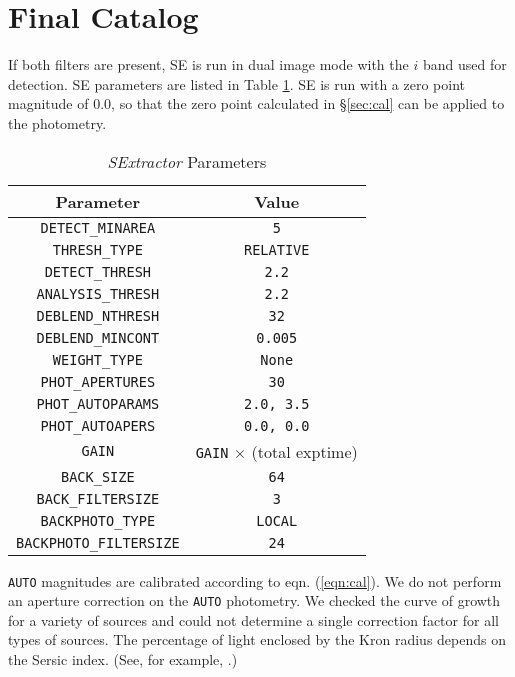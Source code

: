 \documentclass{article}
\begin{document}
\section{Final Catalog}
If both filters are present, SE is run in dual image
mode with the $i$ band used for detection.  SE parameters are listed
in Table \ref{tab:SE}. SE is run with a zero point magnitude of $0.0$,
so that the zero point calculated in \S \ref{sec:cal} can be applied
to the photometry. \\
\begin{table}
\begin{center}
\caption{\textit{SExtractor} Parameters}
\label{tab:SE}
\begin{tabular}{cc}
\hline
Parameter & Value \\
\hline
\texttt{DETECT\_MINAREA} & \texttt{5} \\
\texttt{THRESH\_TYPE} & \texttt{RELATIVE} \\
\texttt{DETECT\_THRESH} & \texttt{2.2} \\
\texttt{ANALYSIS\_THRESH} & \texttt{2.2} \\
\texttt{DEBLEND\_NTHRESH} & \texttt{32} \\
\texttt{DEBLEND\_MINCONT} & \texttt{0.005} \\
\hline
\texttt{WEIGHT\_TYPE} & \texttt{None} \\
\hline
\texttt{PHOT\_APERTURES} & \texttt{30} \\
\texttt{PHOT\_AUTOPARAMS} & \texttt{2.0, 3.5} \\
\texttt{PHOT\_AUTOAPERS} & \texttt{0.0, 0.0} \\
\texttt{GAIN} & \texttt{GAIN} $\times$ (total exptime) \\
\hline
\texttt{BACK\_SIZE} & \texttt{64} \\
\texttt{BACK\_FILTERSIZE} & \texttt{3} \\
\texttt{BACKPHOTO\_TYPE} & \texttt{LOCAL} \\
\texttt{BACKPHOTO\_FILTERSIZE} & \texttt{24} \\
\hline
\end{tabular}
\end{center}
\end{table}

\noindent \texttt{AUTO} magnitudes are calibrated according
to eqn. (\ref{eqn:cal}). We do not perform an aperture correction on the
\texttt{AUTO} photometry. We checked the curve of growth for a variety of
sources and could not determine a single correction factor for all 
types of sources. The percentage of light enclosed by the Kron radius
depends on the Sersic index. (See, for example, 
.) \\
\end{document}
